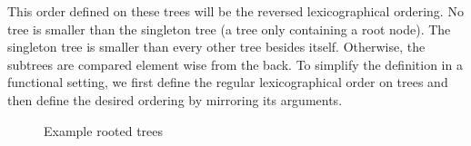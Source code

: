 This order defined on these trees will be the reversed lexicographical ordering.
No tree is smaller than the singleton tree (a tree only containing a root node).
The singleton tree is smaller than every other tree besides itself.
Otherwise, the subtrees are compared element wise from the back.
To simplify the definition in a functional setting, we first define the regular lexicographical order on trees and then define the desired ordering by mirroring its arguments.

\begin{figure}[htpb]
    \centering
    \hspace{2cm}
\caption{Example rooted trees}
\label{fig:example_rooted_trees}
\end{figure}

